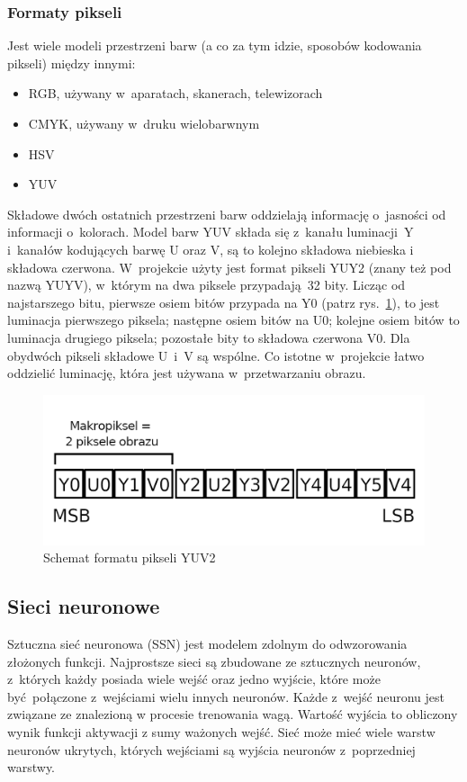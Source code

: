 \documentclass[12pt, oneside, a4paper]{article}
\begin{document}
\subsubsection{Formaty pikseli}\label{Formaty pikseli}
Jest wiele modeli przestrzeni barw (a co za tym idzie, sposobów kodowania
pikseli) między innymi:
\begin{itemize}
  \setlength\itemsep{0.0em}
  \item RGB, używany w~aparatach, skanerach, telewizorach
  \item CMYK, używany w~druku wielobarwnym
  \item HSV
  \item YUV
\end{itemize}
Składowe dwóch ostatnich przestrzeni barw oddzielają informację o~jasności
od informacji o~kolorach. Model barw YUV składa się z~kanału luminacji~Y
i~kanałów kodujących barwę U oraz V, są to kolejno składowa niebieska
i składowa czerwona. W~projekcie użyty jest format pikseli YUY2 (znany też
pod nazwą YUYV), w~którym na dwa piksele przypadają 32 bity.
Licząc od najstarszego bitu, pierwsze osiem bitów przypada na Y0 (patrz
rys.~\ref{fig:yuv2}), to jest
luminacja pierwszego piksela; następne osiem bitów na U0; kolejne osiem bitów
to luminacja drugiego piksela; pozostałe bity to składowa czerwona V0.
Dla obydwóch pikseli składowe U~i~V są wspólne. Co istotne w~projekcie
łatwo oddzielić luminację, która jest używana w~przetwarzaniu obrazu.
\begin{figure}[h]
  \centering
  \includegraphics[scale=1.4]{figures/yuv2-scheme.png} 
  \caption{Schemat formatu pikseli YUV2}\label{fig:yuv2}
\end{figure}

\subsection{Sieci neuronowe}\label{sec:Sieci neuronowe}
Sztuczna sieć neuronowa (SSN) jest modelem zdolnym do odwzorowania złożonych
funkcji. Najprostsze sieci są zbudowane ze sztucznych neuronów, z~których każdy
posiada wiele wejść oraz jedno wyjście, które może być połączone z~wejściami
wielu innych neuronów. Każde z~wejść neuronu jest związane ze znalezioną
w procesie trenowania wagą. Wartość wyjścia to obliczony wynik funkcji aktywacji
z sumy ważonych wejść. Sieć może mieć wiele warstw neuronów ukrytych, których
wejściami są wyjścia neuronów z~poprzedniej warstwy. 
\end{document}
